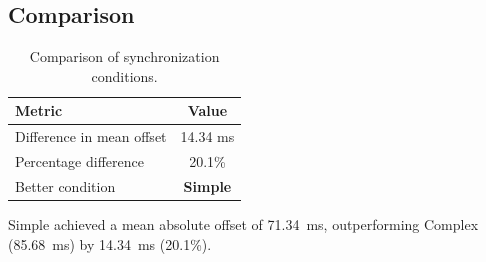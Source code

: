 \subsection*{Comparison}

\begin{table}[h!]
\centering
\begin{tabular}{|l|c|}
\hline
Metric & Value \\
\hline
Difference in mean offset & 14.34 ms \\
Percentage difference & 20.1\% \\
Better condition & \textbf{Simple} \\
\hline
\end{tabular}
\caption{Comparison of synchronization conditions.}
\label{tab:sync_comparison}
\end{table}

Simple achieved a mean absolute offset of 71.34~ms, outperforming Complex (85.68~ms) by 14.34~ms (20.1\%).
